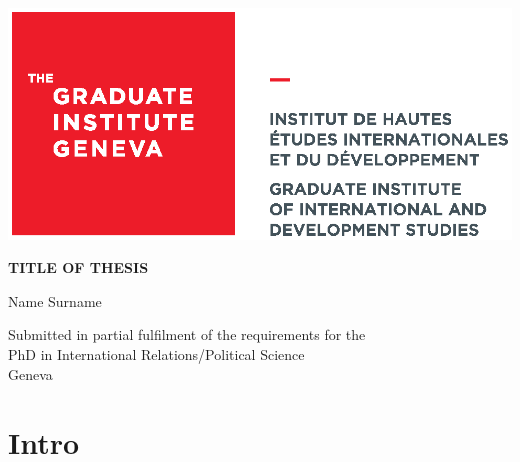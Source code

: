 \documentclass[12pt,a4paper]{article}
\begin{document}
\hspace*{-1.25cm}
\includegraphics[width=0.4\linewidth]{Logo_CMYK_Hi.eps}

{\centering \sffamily
\vspace{3cm}
{\Large\textbf{TITLE OF THESIS}}

\vspace{3cm}
Name Surname

\vspace{8cm}
Submitted in partial fulfilment of the requirements for the\\
	PhD in International Relations/Political Science\\

\vspace{1cm}Geneva

\vspace{1cm}\the\year

}

\newpage
{}
\justifying

\section{Intro}
\end{document}
